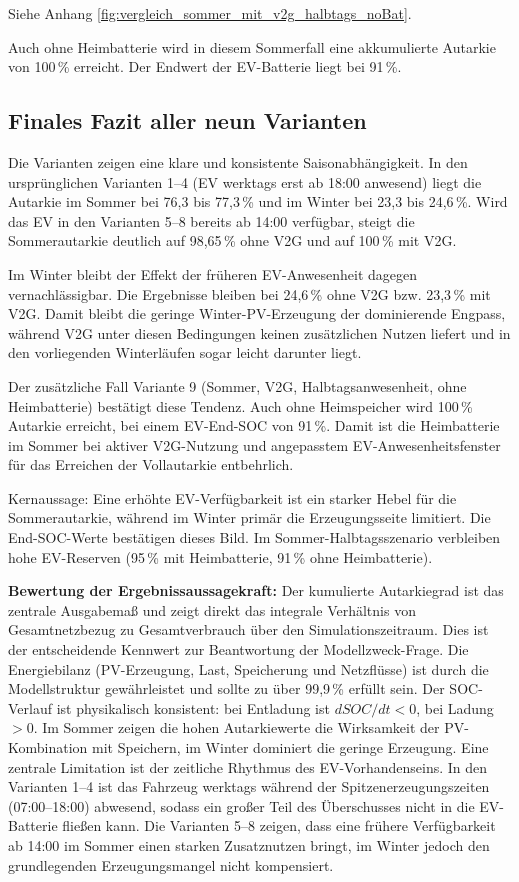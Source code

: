 \documentclass[conference]{IEEEtran}
\begin{document}
Siehe Anhang \ref{fig:vergleich_sommer_mit_v2g_halbtags_noBat}.

Auch ohne Heimbatterie wird in diesem Sommerfall eine akkumulierte Autarkie von 100\,\% erreicht. Der Endwert der EV-Batterie liegt bei 91\,\%.

\subsection{Finales Fazit aller neun Varianten}

Die Varianten zeigen eine klare und konsistente Saisonabhängigkeit. In den ursprünglichen Varianten 1--4 (EV werktags erst ab 18:00 anwesend) liegt die Autarkie im Sommer bei 76,3 bis 77,3\,\% und im Winter bei 23,3 bis 24,6\,\%. Wird das EV in den Varianten 5--8 bereits ab 14:00 verfügbar, steigt die Sommerautarkie deutlich auf 98,65\,\% ohne V2G und auf 100\,\% mit V2G.

Im Winter bleibt der Effekt der früheren EV-Anwesenheit dagegen vernachlässigbar. Die Ergebnisse bleiben bei 24,6\,\% ohne V2G bzw. 23,3\,\% mit V2G. Damit bleibt die geringe Winter-PV-Erzeugung der dominierende Engpass, während V2G unter diesen Bedingungen keinen zusätzlichen Nutzen liefert und in den vorliegenden Winterläufen sogar leicht darunter liegt.

Der zusätzliche Fall Variante 9 (Sommer, V2G, Halbtagsanwesenheit, ohne Heimbatterie) bestätigt diese Tendenz. Auch ohne Heimspeicher wird 100\,\% Autarkie erreicht, bei einem EV-End-SOC von 91\,\%. Damit ist die Heimbatterie im Sommer bei aktiver V2G-Nutzung und angepasstem EV-Anwesenheitsfenster für das Erreichen der Vollautarkie entbehrlich.

Kernaussage: Eine erhöhte EV-Verfügbarkeit ist ein starker Hebel für die Sommerautarkie, während im Winter primär die Erzeugungsseite limitiert. Die End-SOC-Werte bestätigen dieses Bild. Im Sommer-Halbtagsszenario verbleiben hohe EV-Reserven (95\,\% mit Heimbatterie, 91\,\% ohne Heimbatterie).

\textbf{Bewertung der Ergebnissaussagekraft:} Der kumulierte Autarkiegrad ist das zentrale Ausgabemaß und zeigt direkt das integrale Verhältnis von Gesamtnetzbezug zu Gesamtverbrauch über den Simulationszeitraum. Dies ist der entscheidende Kennwert zur Beantwortung der Modellzweck-Frage. Die Energiebilanz (PV-Erzeugung, Last, Speicherung und Netzflüsse) ist durch die Modellstruktur gewährleistet und sollte zu über 99,9\,\% erfüllt sein. Der SOC-Verlauf ist physikalisch konsistent: bei Entladung ist $dSOC/dt < 0$, bei Ladung $> 0$. Im Sommer zeigen die hohen Autarkiewerte die Wirksamkeit der PV-Kombination mit Speichern, im Winter dominiert die geringe Erzeugung. Eine zentrale Limitation ist der zeitliche Rhythmus des EV-Vorhandenseins. In den Varianten 1--4 ist das Fahrzeug werktags während der Spitzenerzeugungszeiten (07:00--18:00) abwesend, sodass ein großer Teil des Überschusses nicht in die EV-Batterie fließen kann. Die Varianten 5--8 zeigen, dass eine frühere Verfügbarkeit ab 14:00 im Sommer einen starken Zusatznutzen bringt, im Winter jedoch den grundlegenden Erzeugungsmangel nicht kompensiert.
\end{document}
